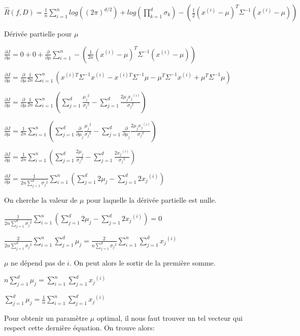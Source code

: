 \documentclass[a4paper,10pt]{article}
\begin{document}
$ \widehat{R}(f,D) = \frac{1}{n} \sum_{i=1}^{n} log((2 \pi)^{d/2} )+log(\prod_{k=1}^{d} \sigma_{k} ) - (\frac{1}{2} (x^{(i)}- \mu)^{T} \Sigma^{-1} (x^{(i)}- \mu) ) $

Dérivée partielle pour $\mu$

$\frac{\partial J}{\partial \mu} = 0 + 0 + \frac{\partial }{\partial \mu} \sum_{i=1}^{n}  - (\frac{1}{2n} (x^{(i)}- \mu)^{T} \Sigma^{-1} (x^{(i)}- \mu) )$ 

$\frac{\partial J}{\partial \mu}=\frac{\partial }{\partial \mu} \frac{1}{2n} \sum_{i=1}^{n} (x^{(i)T} \Sigma^{-1} x^{(i)} - x^{(i)T} \Sigma^{-1} \mu - \mu^{T}\Sigma^{-1} x^{(i)} + \mu^{T}\Sigma^{-1}\mu)$

$\frac{\partial J}{\partial \mu}=\frac{\partial }{\partial \mu} \frac{1}{2n} \sum_{i=1}^{n} (\sum_{j=1}^{d} \frac{{\mu_j}^2}{{\sigma_j}^2} - \sum_{j=1}^{d} \frac{2 \mu_j {x_j}^{(i)} }{{\sigma_j}^2})$

$\frac{\partial J}{\partial \mu}=\frac{1}{2n} \sum_{i=1}^{n} (\sum_{j=1}^{d} \frac{\partial } {\partial \mu_j} \frac{{\mu_j}^2}{{\sigma_j}^2} - \sum_{j=1}^{d} \frac{\partial }{\partial \mu_j} \frac{2 \mu_j {x_j}^{(i)} }{{\sigma_j}^2})$

$\frac{\partial J}{\partial \mu}=\frac{1}{2n} \sum_{i=1}^{n} (\sum_{j=1}^{d} \frac{2{\mu_j}}{{\sigma_j}^2} - \sum_{j=1}^{d} \frac{2 {x_j}^{(i)} }{{\sigma_j}^2})$

$\frac{\partial J}{\partial \mu}=\frac{1}{2n \sum_{j=1}^{d} {\sigma_j}^2} \sum_{i=1}^{n} (\sum_{j=1}^{d} 2{\mu_j} - \sum_{j=1}^{d} 2 {x_j}^{(i)})$

On cherche la valeur de $\mu$ pour laquelle la dérivée partielle est nulle.

$\frac{1}{2n \sum_{j=1}^{d} {\sigma_j}^2} \sum_{i=1}^{n} (\sum_{j=1}^{d} 2{\mu_j} - \sum_{j=1}^{d} 2 {x_j}^{(i)}) = 0$

$\frac{2}{2n \sum_{j=1}^{d} {\sigma_j}^2} \sum_{i=1}^{n} \sum_{j=1}^{d} {\mu_j} = \frac{2}{n \sum_{j=1}^{d} {\sigma_j}^2} \sum_{i=1}^{n} \sum_{j=1}^{d}  {x_j}^{(i)}$

$\mu$ ne dépend pas de $i$. On peut alors le sortir de la première somme.

$n \sum_{j=1}^{d} {\mu_j} = \sum_{i=1}^{n} \sum_{j=1}^{d}  {x_j}^{(i)}$

$\sum_{j=1}^{d} {\mu_j} = \frac{1}{n} \sum_{i=1}^{n} \sum_{j=1}^{d}  {x_j}^{(i)}$

Pour obtenir un paramètre $\mu$ optimal, il nous faut trouver un tel vecteur qui respect cette dernière équation. On trouve alors:
\end{document}
